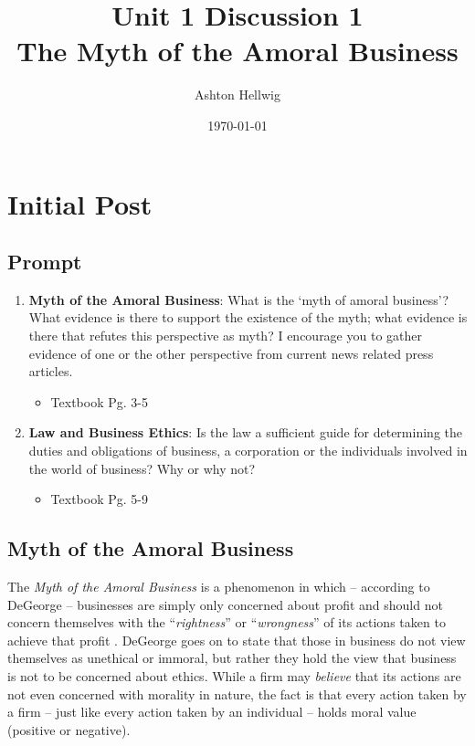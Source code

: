 \documentclass[12pt]{article}
\title{%
    Unit 1 Discussion 1\\%
    \large{The Myth of the Amoral Business}
  }
\author{Ashton Hellwig}
\date{\today}
\begin{document}
  \maketitle
  
  \section{Initial Post}
    \begin{mdframed}
      \vspace{-10pt}
      \subsection*{Prompt}
      \begin{enumerate}
        \item \textbf{Myth of the Amoral Business}: What is the ‘myth of amoral business’? What evidence is
          there to support the existence of the myth; what evidence is there that refutes this perspective as
          myth? I encourage you to gather evidence of one or the other perspective from current news related press articles.
          \begin{itemize}
              \item Textbook Pg. 3-5
          \end{itemize}
        \item \textbf{Law and Business Ethics}: Is the law a sufficient guide for determining the duties and
          obligations of business, a corporation or the individuals involved in the world of business? Why or
          why not?
          \begin{itemize}
              \item Textbook Pg. 5-9
          \end{itemize}
      \end{enumerate}
    \end{mdframed}
  
    \subsection{Myth of the Amoral Business}
      The \textit{Myth of the Amoral Business} is a phenomenon in which -- according to DeGeorge --
        businesses are simply only concerned about profit and should not concern themselves with the
        ``\textit{rightness}'' or ``\textit{wrongness}'' of its actions taken to achieve that
        profit \autocite{textbook}. DeGeorge goes on to state that those in business do not view
        themselves as unethical or immoral, but rather they hold the view that business is not
        to be concerned about ethics. While a firm may \textit{believe} that its actions are
        not even concerned with morality in nature, the fact is that every action taken by a
        firm -- just like every action taken by an individual -- holds moral value (positive or
        negative).
\end{document}
